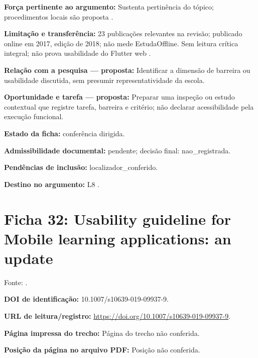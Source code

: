 \noindent\textbf{Força pertinente ao argumento:} Sustenta pertinência do tópico; procedimentos locais são proposta \citep{kumar2017}.\par\medskip

\noindent\textbf{Limitação e transferência:} 23 publicações relevantes na revisão; publicado online em 2017, edição de 2018; não mede EstudaOffline. Sem leitura crítica integral; não prova usabilidade do Flutter web \citep{kumar2017}.\par\medskip

\noindent\textbf{Relação com a pesquisa — proposta:} Identificar a dimensão de barreira ou usabilidade discutida, sem presumir representatividade da escola.\par\medskip

\noindent\textbf{Oportunidade e tarefa — proposta:} Preparar uma inspeção ou estudo contextual que registre tarefa, barreira e critério; não declarar acessibilidade pela execução funcional.\par\medskip

\noindent\textbf{Estado da ficha:} conferência dirigida.\par\medskip

\noindent\textbf{Admissibilidade documental:} pendente; decisão final: nao\_registrada.\par\medskip

\noindent\textbf{Pendências de inclusão:} localizador\_conferido.\par\medskip

\noindent\textbf{Destino no argumento:} L8 .

\clearpage\section*{Ficha 32: Usability guideline for Mobile learning applications: an update}

Fonte: \citet{kumarguideline2019}.

\noindent\textbf{DOI de identificação:} 10.1007/s10639-019-09937-9.\par\medskip

\noindent\textbf{URL de leitura/registro:} \url{https://doi.org/10.1007/s10639-019-09937-9}.\par\medskip

\noindent\textbf{Página impressa do trecho:} Página do trecho não conferida.\par\medskip

\noindent\textbf{Posição da página no arquivo PDF:} Posição não conferida.\par\medskip

